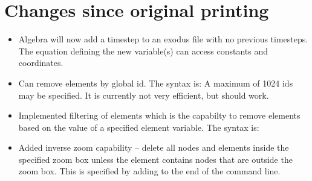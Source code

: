 \section{Changes since original printing}
\begin{itemize}
  \item Algebra will now add a timestep to an exodus file with no previous timesteps.  The equation 
	    defining the new variable(s) can access constants and coordinates.

  \item	Can remove elements by global id. The syntax is:
    A maximum of 1024 ids may be specified. It is currently not very efficient, but should work.

  \item Implemented filtering of elements which is the capabilty
    to remove elements based on the value of a specified element
    variable.  The syntax is:



\item Added inverse zoom capability -- delete all nodes and
  elements inside the specified zoom box unless the element
  contains nodes that are outside the zoom box. This is
  specified by adding  to the end of the
   command line.
\end{itemize}

